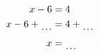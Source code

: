 \documentclass[varwidth]{standalone}
\begin{document}
    \begin{varwidth}{0.25\paperwidth}
    \begin{align*}
    x - 6 &= 4\\
    x - 6 + \dotuline{\hspace{4mm}} &= 4 + \dotuline{\hspace{4mm}}\\
    x &= \dotuline{\hspace{4mm}}\\
\end{align*}
\end{varwidth}
\end{document}
